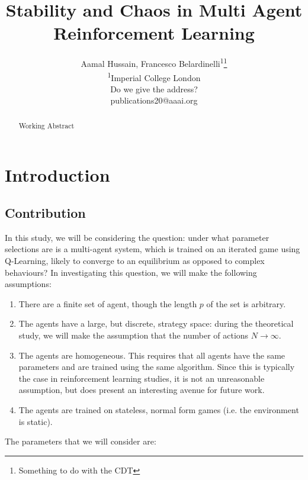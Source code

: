 \documentclass[letterpaper]{article} %
\title{Stability and Chaos in Multi Agent Reinforcement Learning}
\author{Aamal Hussain, Francesco Belardinelli\textsuperscript{\rm 1}\thanks{Something to do with the
CDT}\\ %
\textsuperscript{\rm 1}Imperial College London\\ %
Do we give the address? \fb{normally the submission is blind.}\\
publications20@aaai.org %
}
\begin{document}
\maketitle

\begin{abstract}
Working Abstract
\end{abstract}

\section{Introduction}

\subsection{Contribution}


In this study, we will be considering the question: under what parameter selections are is a
multi-agent system, which is trained on an iterated game using Q-Learning, likely to converge to an
equilibrium as opposed to complex behaviours? In investigating this question, we will make the
following assumptions:

\begin{enumerate}
    \item There are a finite set of agent, though the length $p$ of the set is arbitrary. 
    \item The agents have a large, but discrete, strategy space: during the theoretical study, we
    will make the assumption that the number of actions $N \rightarrow \infty$.
    \item The agents are homogeneous. This requires that all agents have the same parameters and are
    trained using the same algorithm. Since this is typically the case in reinforcement learning
    studies, it is not an unreasonable assumption, but does present an interesting avenue for future
    work.
    \item The agents are trained on stateless, normal form games (i.e. the environment is static).
\end{enumerate}

The parameters that we will consider are:
\end{document}
